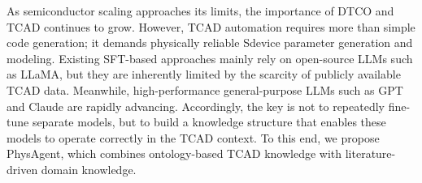 As semiconductor scaling approaches its limits, the importance of DTCO and TCAD continues to grow. However, TCAD automation requires more than simple code generation; it demands physically reliable Sdevice parameter generation and modeling. Existing SFT-based approaches mainly rely on open-source LLMs such as LLaMA, but they are inherently limited by the scarcity of publicly available TCAD data. Meanwhile, high-performance general-purpose LLMs such as GPT and Claude are rapidly advancing. Accordingly, the key is not to repeatedly fine-tune separate models, but to build a knowledge structure that enables these models to operate correctly in the TCAD context. To this end, we propose PhysAgent, which combines ontology-based TCAD knowledge with literature-driven domain knowledge.
